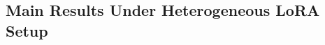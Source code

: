 \documentclass{article} %
\theoremstyle{plain}
\theoremstyle{definition}
\begin{document}



\subsection{Main Results Under Heterogeneous LoRA Setup}
\end{document}

